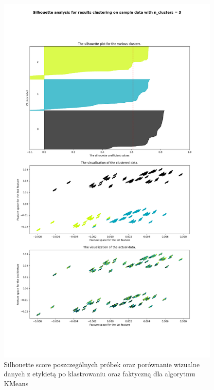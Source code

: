 \documentclass{classrep}
\begin{document}
{{{                 \begin{figure}[!htbp]
                    \centering
                    \includegraphics[width=1\textwidth]{img/clustering/kmeans_silh_crime_codes.png}
                    \caption{Silhouette score poszczególnych próbek oraz porównanie wizualne
                    danych z etykietą po klastrowaniu oraz faktyczną dla algorytmu KMeans}
                    \label{silh_kmeans}
                \end{figure}
                \FloatBarrier
                
}}}
\end{document}
